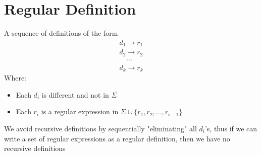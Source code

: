 \documentclass{article}[18pt]
\begin{document}
\section{Regular Definition}
\begin{definition}
	A sequence of definitions of the form
	$$
	\begin{array}{l}{d_{1} \rightarrow r_{1}} \\ {d_{2} \rightarrow r_{2}} \\ {\quad \cdots} \\ {d_{k} \rightarrow r_{k}}\end{array}
	$$
	Where:
	\begin{itemize}
		\item Each $d_i$ is different and not in $\Sigma$
		\item Each $r_i$ is a regular expression in $\Sigma \cup \{r_1,r_2,...,r_{i-1}\}$
	\end{itemize}
\end{definition}
We avoid recursive definitions by sequentially "eliminating" all $d_i$'s, thus if we can write a set of regular expressions as a regular definition, then we have no recursive definitions
\end{document}
